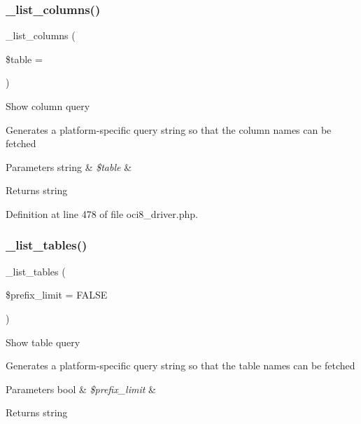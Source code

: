 \subsubsection{\texorpdfstring{\_list\_columns()}{\_list\_columns()}}
{\footnotesize\ttfamily \+\_\+list\+\_\+columns (\begin{DoxyParamCaption}\item[{}]{\$table = {\ttfamily \textquotesingle{}\textquotesingle{}} }\end{DoxyParamCaption})\hspace{0.3cm}{\ttfamily [protected]}}

Show column query

Generates a platform-\/specific query string so that the column names can be fetched


\begin{DoxyParams}[1]{Parameters}
string & {\em \$table} & \\
\hline
\end{DoxyParams}
\begin{DoxyReturn}{Returns}
string 
\end{DoxyReturn}


Definition at line 478 of file oci8\+\_\+driver.\+php.

\mbox{\label{class_c_i___d_b__oci8__driver_a435c0f3ce54fe7daa178baa8532ebd54}} 
\subsubsection{\texorpdfstring{\_list\_tables()}{\_list\_tables()}}
{\footnotesize\ttfamily \+\_\+list\+\_\+tables (\begin{DoxyParamCaption}\item[{}]{\$prefix\+\_\+limit = {\ttfamily FALSE} }\end{DoxyParamCaption})\hspace{0.3cm}{\ttfamily [protected]}}

Show table query

Generates a platform-\/specific query string so that the table names can be fetched


\begin{DoxyParams}[1]{Parameters}
bool & {\em \$prefix\+\_\+limit} & \\
\hline
\end{DoxyParams}
\begin{DoxyReturn}{Returns}
string 
\end{DoxyReturn}


